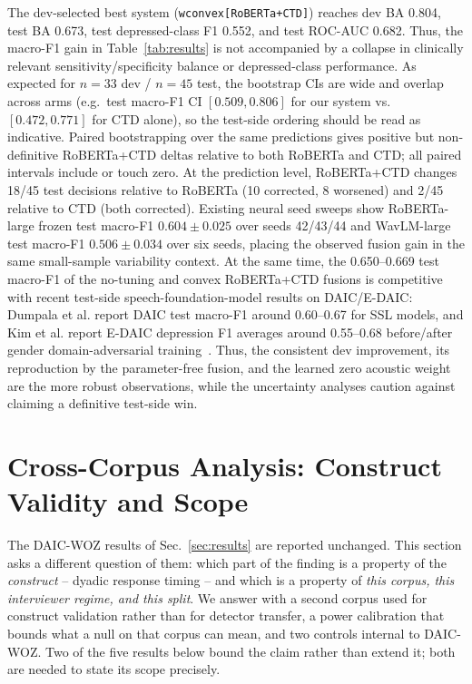 \documentclass{article}
\begin{document}
The dev-selected best system (\texttt{wconvex[RoBERTa+CTD]}) reaches dev BA 0.804, test BA 0.673, test depressed-class F1 0.552, and test ROC-AUC 0.682. Thus, the macro-F1 gain in Table~\ref{tab:results} is not accompanied by a collapse in clinically relevant sensitivity/specificity balance or depressed-class performance. As expected for $n{=}33$ dev / $n{=}45$ test, the bootstrap CIs are wide and overlap across arms (e.g.\ test macro-F1 CI $[0.509, 0.806]$ for our system vs.\ $[0.472, 0.771]$ for CTD alone), so the test-side ordering should be read as indicative. Paired bootstrapping over the same predictions gives positive but non-definitive RoBERTa+CTD deltas relative to both RoBERTa and CTD; all paired intervals include or touch zero. At the prediction level, RoBERTa+CTD changes 18/45 test decisions relative to RoBERTa (10 corrected, 8 worsened) and 2/45 relative to CTD (both corrected). Existing neural seed sweeps show RoBERTa-large frozen test macro-F1 $0.604{\pm}0.025$ over seeds 42/43/44 and WavLM-large test macro-F1 $0.506{\pm}0.034$ over six seeds, placing the observed fusion gain in the same small-sample variability context. At the same time, the 0.650--0.669 test macro-F1 of the no-tuning and convex RoBERTa+CTD fusions is competitive with recent test-side speech-foundation-model results on DAIC/E-DAIC: Dumpala et al. report DAIC test macro-F1 around 0.60--0.67 for SSL models, and Kim et al. report E-DAIC depression F1 averages around 0.55--0.68 before/after gender domain-adversarial training~\cite{dumpala2025ttt,kim2025dat}. Thus, the consistent dev improvement, its reproduction by the parameter-free fusion, and the learned zero acoustic weight are the more robust observations, while the uncertainty analyses caution against claiming a definitive test-side win.




\section{Cross-Corpus Analysis: Construct Validity and Scope}
\label{sec:audit}
The DAIC-WOZ results of Sec.~\ref{sec:results} are reported unchanged. This section asks a different question of them: which part of the finding is a property of the \emph{construct} -- dyadic response timing -- and which is a property of \emph{this corpus, this interviewer regime, and this split}. We answer with a second corpus used for construct validation rather than for detector transfer, a power calibration that bounds what a null on that corpus can mean, and two controls internal to DAIC-WOZ. Two of the five results below bound the claim rather than extend it; both are needed to state its scope precisely.
\end{document}
